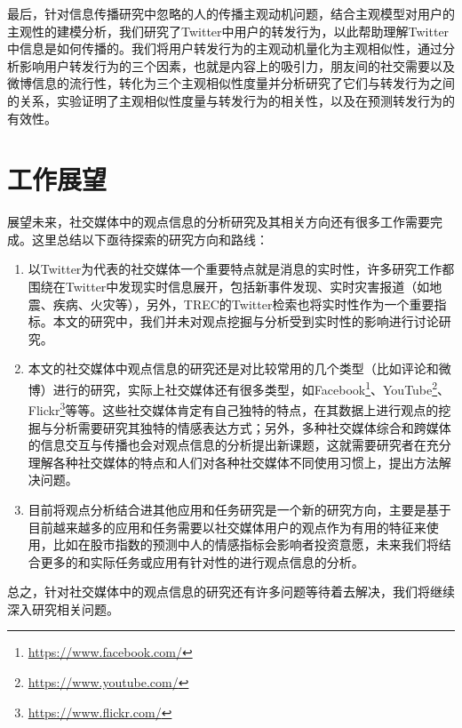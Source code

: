 最后，针对信息传播研究中忽略的人的传播主观动机问题，结合主观模型对用户的主观性的建模分析，我们研究了Twitter中用户的转发行为，以此帮助理解Twitter中信息是如何传播的。我们将用户转发行为的主观动机量化为主观相似性，通过分析影响用户转发行为的三个因素，也就是内容上的吸引力，朋友间的社交需要以及微博信息的流行性，转化为三个主观相似性度量并分析研究了它们与转发行为之间的关系，实验证明了主观相似性度量与转发行为的相关性，以及在预测转发行为的有效性。

\section{工作展望}
展望未来，社交媒体中的观点信息的分析研究及其相关方向还有很多工作需要完成。这里总结以下亟待探索的研究方向和路线：
  \begin{enumerate}
  \item 以Twitter为代表的社交媒体一个重要特点就是消息的实时性，许多研究工作都围绕在Twitter中发现实时信息展开，包括新事件发现、实时灾害报道（如地震、疾病、火灾等），另外，TREC的Twitter检索也将实时性作为一个重要指标。本文的研究中，我们并未对观点挖掘与分析受到实时性的影响进行讨论研究。
  
 \item 本文的社交媒体中观点信息的研究还是对比较常用的几个类型（比如评论和微博）进行的研究，实际上社交媒体还有很多类型，如Facebook\footnote{\url{https://www.facebook.com/}}、YouTube\footnote{\url{https://www.youtube.com/}}、 Flickr\footnote{\url{https://www.flickr.com/}}等等。这些社交媒体肯定有自己独特的特点，在其数据上进行观点的挖掘与分析需要研究其独特的情感表达方式；另外，多种社交媒体综合和跨媒体的信息交互与传播也会对观点信息的分析提出新课题，这就需要研究者在充分理解各种社交媒体的特点和人们对各种社交媒体不同使用习惯上，提出方法解决问题。
 
 \item 目前将观点分析结合进其他应用和任务研究是一个新的研究方向，主要是基于目前越来越多的应用和任务需要以社交媒体用户的观点作为有用的特征来使用，比如在股市指数的预测中人的情感指标会影响者投资意愿，未来我们将结合更多的和实际任务或应用有针对性的进行观点信息的分析。 
  \end{enumerate}
  
  总之，针对社交媒体中的观点信息的研究还有许多问题等待着去解决，我们将继续深入研究相关问题。

